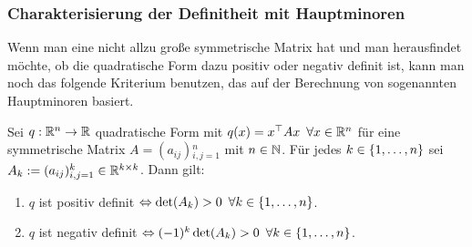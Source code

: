 \subsubsection{Charakterisierung der Definitheit mit Hauptminoren}
\label{sec:7_3_8}

Wenn man eine nicht allzu große symmetrische Matrix hat und man herausfindet möchte, ob die quadratische Form dazu positiv oder negativ definit ist, kann man noch das folgende Kriterium benutzen, das auf der Berechnung von sogenannten Hauptminoren basiert. 

\begin{thm}
	Sei $ q : \mathbb R^n \to \mathbb R $ quadratische Form mit $ q(x) = x^\top Ax \enspace \forall x \in \mathbb R^n $ für eine symmetrische Matrix $ A = (a_{ij}){}_{i,j=1}^n $ mit $ n \in \mathbb N $. Für jedes $ k \in \{ 1,\ldots,n \} $ sei $ A_k := (a_{ij}){}_{i,j=1}^k \in \mathbb R^{k \times k} $. Dann gilt:
	\begin{enumerate}
		\item
			$ q $ ist positiv definit $ \Leftrightarrow \det(A_k) > 0 \enspace \forall k \in \{ 1,\ldots,n \} $.
		\item
			$ q $ ist negativ definit $ \Leftrightarrow (-1)^k\det(A_k) > 0 \enspace \forall k \in \{ 1,\ldots,n \} $.
	\end{enumerate}
\end{thm}
